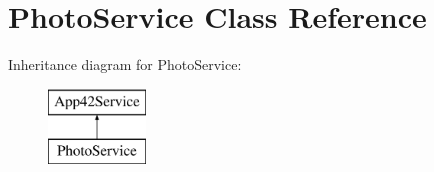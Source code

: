 \hypertarget{class_photo_service}{\section{Photo\+Service Class Reference}
\label{class_photo_service}
}
Inheritance diagram for Photo\+Service\+:\begin{figure}[H]
\begin{center}
\leavevmode
\includegraphics[height=2.000000cm]{class_photo_service}
\end{center}
\end{figure}
